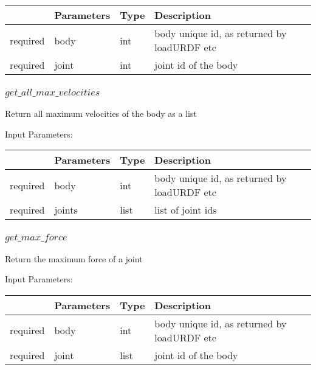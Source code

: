 \documentclass[
	ngerman,
	accentcolor=9c,%
	type=intern,
	marginpar=false
	]{tudapub}
\begin{document}
\begin{tabular}{|p{}|p{}|p{}| p{}|}
\hline
 & \textbf{Parameters} & \textbf{Type} & \textbf{Description} \\
\hline
required & body & int & body unique id, as returned by loadURDF etc\\
\hline
required & joint & int & joint id of the body\\
\hline
\end{tabular}
\vspace{0.5cm}






\subsubsection{$get\_all\_max\_velocities$}
\noindent Return all maximum velocities of the body as a list


\vspace{0.5cm}
\noindent Input Parameters:
\vspace{0.5cm}

\begin{tabular}{|p{}|p{}|p{}| p{}|}
\hline
 & \textbf{Parameters} & \textbf{Type} & \textbf{Description} \\
\hline
required & body & int & body unique id, as returned by loadURDF etc\\
\hline
required & joints & list & list of joint ids\\
\hline
\end{tabular}
\vspace{0.5cm}



\subsubsection{$get\_max\_force$}
\noindent Return the maximum force of a joint


\vspace{0.5cm}
\noindent Input Parameters:
\vspace{0.5cm}

\begin{tabular}{|p{}|p{}|p{}| p{}|}
\hline
 & \textbf{Parameters} & \textbf{Type} & \textbf{Description} \\
\hline
required & body & int & body unique id, as returned by loadURDF etc\\
\hline
required & joint & list & joint id of the body\\
\hline
\end{tabular}
\vspace{0.5cm}
\end{document}
